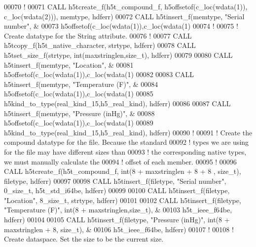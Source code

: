 \begin{DoxyCode}
00070   \textcolor{comment}{!}
00071   \textcolor{keyword}{CALL }h5tcreate\_f(h5t\_compound\_f, h5offsetof(c\_loc(wdata(1)), c\_loc(wdata(2))), memtype, hdferr)
00072   \textcolor{keyword}{CALL }h5tinsert\_f(memtype, \textcolor{stringliteral}{"Serial number"}, &
00073        h5offsetof(c\_loc(wdata(1)),c\_loc(wdata(1)%
00074   \textcolor{comment}{!}
00075   \textcolor{comment}{! Create datatype for the String attribute.}
00076   \textcolor{comment}{!}
00077   \textcolor{keyword}{CALL }h5tcopy\_f(h5t\_native\_character, strtype, hdferr)
00078   \textcolor{keyword}{CALL }h5tset\_size\_f(strtype, int(maxstringlen,size\_t), hdferr)  
00079 
00080   \textcolor{keyword}{CALL }h5tinsert\_f(memtype, \textcolor{stringliteral}{"Location"}, &
00081        h5offsetof(c\_loc(wdata(1)),c\_loc(wdata(1)%
00082 
00083   \textcolor{keyword}{CALL }h5tinsert\_f(memtype, \textcolor{stringliteral}{"Temperature (F)"}, &
00084        h5offsetof(c\_loc(wdata(1)),c\_loc(wdata(1)%
00085        h5kind\_to\_type(real\_kind\_15,h5\_real\_kind), hdferr)
00086 
00087   \textcolor{keyword}{CALL }h5tinsert\_f(memtype, \textcolor{stringliteral}{"Pressure (inHg)"}, &
00088        h5offsetof(c\_loc(wdata(1)),c\_loc(wdata(1)%
00089        h5kind\_to\_type(real\_kind\_15,h5\_real\_kind), hdferr)
00090   \textcolor{comment}{!}
00091   \textcolor{comment}{! Create the compound datatype for the file.  Because the standard}
00092   \textcolor{comment}{! types we are using for the file may have different sizes than}
00093   \textcolor{comment}{! the corresponding native types, we must manually calculate the}
00094   \textcolor{comment}{! offset of each member.}
00095   \textcolor{comment}{!}
00096   \textcolor{keyword}{CALL }h5tcreate\_f(h5t\_compound\_f, int(8 + maxstringlen + 8 + 8 , size\_t), filetype, hdferr)
00097   
00098   \textcolor{keyword}{CALL }h5tinsert\_f(filetype, \textcolor{stringliteral}{"Serial number"}, 0\_size\_t, h5t\_std\_i64be, hdferr)
00099 
00100   \textcolor{keyword}{CALL }h5tinsert\_f(filetype, \textcolor{stringliteral}{"Location"}, 8\_size\_t, strtype, hdferr)
00101 
00102   \textcolor{keyword}{CALL }h5tinsert\_f(filetype, \textcolor{stringliteral}{"Temperature (F)"}, int(8 + maxstringlen,size\_t), &
00103        h5t\_ieee\_f64be, hdferr)
00104 
00105   \textcolor{keyword}{CALL }h5tinsert\_f(filetype, \textcolor{stringliteral}{"Pressure (inHg)"}, int(8 + maxstringlen + 8, size\_t), &
00106        h5t\_ieee\_f64be, hdferr)
00107   \textcolor{comment}{!}
00108   \textcolor{comment}{! Create dataspace.  Set the size to be the current size.}

\end{DoxyCode}
